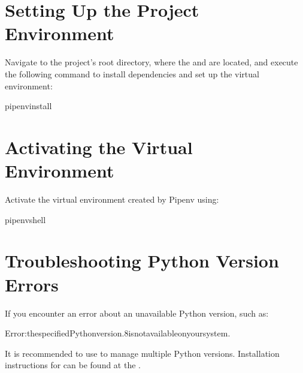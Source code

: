 \documentclass[letterpaper,10pt,english]{sphinxmanual}
\begin{document}
\section{Setting Up the Project Environment}
\label{\detokenize{setup_guide:setting-up-the-project-environment}}
\sphinxAtStartPar
Navigate to the project’s root directory, where the  and  are located, and execute the following command to install dependencies and set up the virtual environment:

\begin{sphinxVerbatim}[commandchars=\\\{\}]
pipenvinstall
\end{sphinxVerbatim}


\section{Activating the Virtual Environment}
\label{\detokenize{setup_guide:activating-the-virtual-environment}}
\sphinxAtStartPar
Activate the virtual environment created by Pipenv using:

\begin{sphinxVerbatim}[commandchars=\\\{\}]
pipenvshell
\end{sphinxVerbatim}


\section{Troubleshooting Python Version Errors}
\label{\detokenize{setup_guide:troubleshooting-python-version-errors}}
\sphinxAtStartPar
If you encounter an error about an unavailable Python version, such as:

\begin{sphinxVerbatim}[commandchars=\\\{\}]
Error:thespecifiedPythonversion.8isnotavailableonyoursystem.
\end{sphinxVerbatim}

\sphinxAtStartPar
It is recommended to use  to manage multiple Python versions. Installation instructions for  can be found at the .
\end{document}
